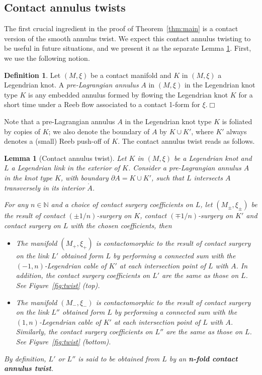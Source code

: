 \documentclass[11pt]{amsart} %
\def\dfn#1{{\textbf{#1}}}
\newcommand{\N}{\mathbb{N}}
\theoremstyle{plain}
\newtheorem{lem}[Theorem]{Lemma}
\theoremstyle{definition}
\newtheorem{defi}[Theorem]{Definition}
\begin{document}
\subsection{Contact annulus twists}\label{annulustwist}
The first crucial ingredient in the proof of Theorem~\ref{thm:main} is a contact version of the smooth annulus twist. We expect this contact annulus twisting to be useful in future situations, and we present it as the separate Lemma \ref{lem:twist}. First, we use the following notion.

\begin{defi}
Let $(M,\xi)$ be a contact manifold and $K$ in $(M,\xi)$ a Legendrian knot. A \textit{pre-Lagrangian annulus} $A$ in $(M,\xi)$ in the Legendrian knot type $K$ is any embedded annulus formed by flowing the Legendrian knot $K$ for a short time under a Reeb flow associated to a contact 1-form for $\xi$.\hfill$\Box$
\end{defi}

Note that a pre-Lagrangian annulus $A$ in the Legendrian knot type $K$ is foliated by copies of $K$; we also denote the boundary of $A$ by $K\cup K'$, where $K'$ always denotes a (small) Reeb push-off of $K$. The contact annulus twist reads as follows.

\begin{lem}[Contact annulus twist]\label{lem:twist}
Let $K$ in $(M,\xi)$ be a Legendrian knot and $L$ a Legendrian link in the exterior of $K$. Consider a pre-Lagrangian annulus  $A$ in the knot type $K$, with boundary $\partial A=K\cup K'$, such that $L$ intersects $A$ transversely in its interior $\mathring{A}$.

For any $n\in \N$ and a choice of contact surgery coefficients on $L$, let $(M_\pm,\xi_\pm)$ be the result of contact $(\pm 1/n)$-surgery on $K$, contact $(\mp 1/n)$-surgery on $K'$ and contact surgery on $L$ with the chosen coefficients, then
\begin{itemize}
	\item[(i)] The manifold $(M_+,\xi_+)$ is contactomorphic to the result of contact surgery on the link $L'$ obtained form $L$ by performing a connected sum with the $(-1,n)$-Legendrian cable of $K'$ at each intersection point of $L$ with $A$. In addition, the contact surgery coefficients on $L'$ are the same as those on $L$. See Figure~\ref{fig:twist} (top).\\
	
	\item[(ii)] The manifold $(M_-,\xi_-)$ is contactomorphic to the result of contact surgery on the link $L''$ obtained form $L$ by performing a connected sum with the $(1,n)$-Legendrian cable of $K'$ at each intersection point of $L$ with $A$. Similarly, the contact surgery coefficients on $L''$ are the same as those on $L$. See Figure~\ref{fig:twist} (bottom).
\end{itemize}
By definition, $L'$ or $L''$ is said to be obtained from $L$ by an \dfn{n-fold contact annulus twist}. 
\end{lem}
\end{document}
